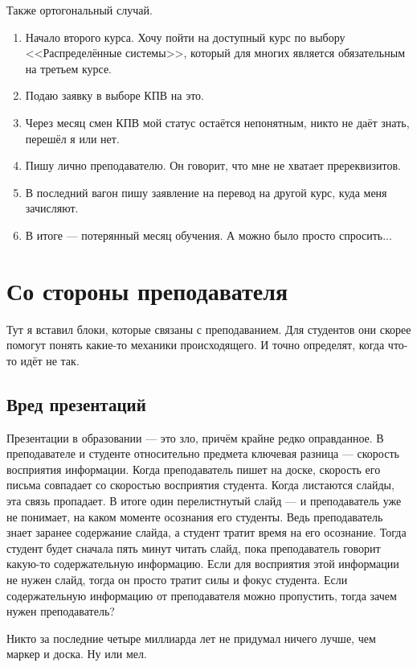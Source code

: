 \documentclass[12pt, a4paper]{article}
\begin{document}
Также ортогональный случай. 
\begin{enumerate}
    \item Начало второго курса. Хочу пойти на доступный курс по выбору <<Распределённые системы>>, который для многих является обязательным на третьем курсе.
    \item Подаю заявку в выборе КПВ на это. 
    \item Через месяц смен КПВ мой статус остаётся непонятным, никто не даёт знать, перешёл я или нет.
    \item Пишу лично преподавателю. Он говорит, что мне не хватает пререквизитов.
    \item В последний вагон пишу заявление на перевод на другой курс, куда меня зачисляют.
    \item В итоге --- потерянный месяц обучения. А можно было просто спросить...
\end{enumerate}

\section{Со стороны преподавателя}

Тут я вставил блоки, которые связаны с преподаванием. Для студентов они скорее помогут понять какие-то механики происходящего. И точно определят, когда что-то идёт не так.

\subsection{Вред презентаций}

Презентации в образовании --- это зло, причём крайне редко оправданное. В преподавателе и студенте относительно предмета ключевая разница --- скорость восприятия информации. Когда преподаватель пишет на доске, скорость его письма совпадает со скоростью восприятия студента. Когда листаются слайды, эта связь пропадает. В итоге один перелистнутый слайд --- и преподаватель уже не понимает, на каком моменте осознания его студенты. Ведь преподаватель знает заранее содержание слайда, а студент тратит время на его осознание. Тогда студент будет сначала пять минут читать слайд, пока преподаватель говорит какую-то содержательную информацию. Если для восприятия этой информации не нужен слайд, тогда он просто тратит силы и фокус студента. Если содержательную информацию от преподавателя можно пропустить, тогда зачем нужен преподаватель?

Никто за последние четыре миллиарда лет не придумал ничего лучше, чем маркер и доска. Ну или мел. 
\end{document}
